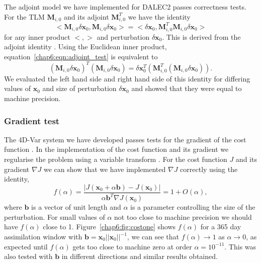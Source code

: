 The adjoint model we have implemented for DALEC2 passes correctness tests. For the TLM $\mathbf{M}_{i,0}$ and its adjoint $\mathbf{M}_{i,0}^{T}$ we have the identity
\begin{equation}
<\mathbf{M}_{i,0}\delta\textbf{x}_0, \mathbf{M}_{i,0}\delta\textbf{x}_0> = <\delta\textbf{x}_0, \mathbf{M}_{i,0}^{T}\mathbf{M}_{i,0}\delta\textbf{x}_0> \label{chap6:eqn:adjoint_test}
\end{equation}
for any inner product $<, >$ and perturbation $\delta \textbf{x}_0$. This is derived from the adjoint identity \citep{lawless2013}. Using the Euclidean inner product, equation~\eqref{chap6:eqn:adjoint_test} is equivalent to
\begin{equation}
(\mathbf{M}_{i,0}\delta\textbf{x}_0)^{T} (\mathbf{M}_{i,0}\delta\textbf{x}_0) = \delta\textbf{x}_0^{T} (\mathbf{M}_{i,0}^{T}(\mathbf{M}_{i,0}\delta\textbf{x}_0)).
\end{equation}
We evaluated the left hand side and right hand side of this identity for differing values of $\textbf{x}_0$ and size of perturbation $\delta \textbf{x}_0$ and showed that they were equal to machine precision.

\subsubsection{Gradient test} \label{chap6:sec:testgrad}

The 4D-Var system we have developed passes tests for the gradient of the cost function \citep{Navon1992}. In the implementation of the cost function and its gradient we regularise the problem using a variable transform \citep{Freitag2010}. For the cost function $J$ and its gradient $\nabla J$ we can show that we have implemented $\nabla J$ correctly using the identity,
\begin{equation}
f(\alpha)=\frac{| J( \textbf{x}_0 + \alpha \textbf{b}) - J(\textbf{x}_0) |}{\alpha \textbf{b}^{T} \nabla J(\textbf{x}_0)} = 1 + O(\alpha),
\end{equation}
where $\textbf{b}$ is a vector of unit length and $\alpha$ is a parameter controlling the size of the perturbation. For small values of $\alpha$ not too close to machine precision we should have $f(\alpha)$ close to 1. Figure~\ref{chap6:fig:costone} shows $f(\alpha)$ for a 365 day assimilation window with $\textbf{b}=\textbf{x}_0||\textbf{x}_0||^{-1}$, we can see that $f(\alpha) \rightarrow 1$ as $\alpha \rightarrow 0$, as expected until $f(\alpha)$ gets too close to machine zero at order $\alpha = 10^{-11}$. This was also tested with $\textbf{b}$ in different directions and similar results obtained.

